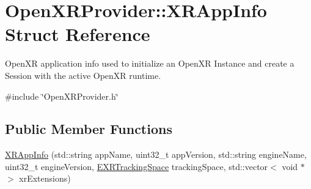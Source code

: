 \hypertarget{struct_open_x_r_provider_1_1_x_r_app_info}{}\section{Open\+X\+R\+Provider\+::X\+R\+App\+Info Struct Reference}
\label{struct_open_x_r_provider_1_1_x_r_app_info}


Open\+XR application info used to initialize an Open\+XR Instance and create a Session with the active Open\+XR runtime.  




{\ttfamily \#include \char`\"{}Open\+X\+R\+Provider.\+h\char`\"{}}

\subsection*{Public Member Functions}
\begin{DoxyCompactItemize}
\item 
\mbox{\hyperlink{struct_open_x_r_provider_1_1_x_r_app_info_aadc36b8e45d7bc4c37978f087d9a8dc6}{X\+R\+App\+Info}} (std\+::string app\+Name, uint32\+\_\+t app\+Version, std\+::string engine\+Name, uint32\+\_\+t engine\+Version, \mbox{\hyperlink{namespace_open_x_r_provider_a005dd91723b05b123b8fccbc41798b05}{E\+X\+R\+Tracking\+Space}} tracking\+Space, std\+::vector$<$ void $\ast$ $>$ xr\+Extensions)
\end{DoxyCompactItemize}
